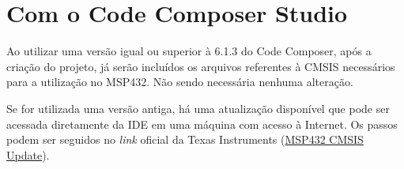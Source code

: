 \section{Com o Code Composer Studio}

Ao utilizar uma versão igual ou superior à 6.1.3 do Code Composer, após a criação do projeto, já serão incluídos os arquivos referentes à CMSIS necessários para a utilização no MSP432. Não sendo necessária nenhuma alteração.

Se for utilizada uma versão antiga, há uma atualização disponível que pode ser acessada diretamente da IDE em uma máquina com acesso à Internet. Os passos podem ser seguidos no \emph{link} oficial da Texas Instruments (\href{http://processors.wiki.ti.com/index.php/MSP432_CMSIS_Update}{MSP432 CMSIS Update}).
